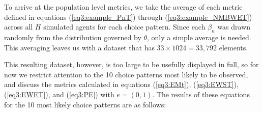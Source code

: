 \documentclass[../main.tex]{subfiles}
\begin{document}
\addtocounter{footnote}{-1}

To arrive at the population level metrics, we take the average of each metric defined in equations (\ref{eq3:example_PnT}) through (\ref{eq3:example_NMBWET}) across all $H$ simulated agents for each choice pattern.
Since each $\beta_n$ was drawn randomly from the distribution governed by $\theta$, only a simple average is needed.
This averaging leaves us with a dataset that has $33 \times 1024 = 33,792$ elements.

This resulting dataset, however, is too large to be usefully displayed in full, so for now we restrict attention to the 10 choice patterns most likely to be observed, and discuss the metrics calculated in equations (\ref{eq3:EMt}), (\ref{eq3:EWST}), (\ref{eq3:EWET}), and (\ref{eq3:PE}) with $e = (0,1)$.
The results of these equations for the 10 most likely choice patterns are as follows:

\break
\end{document}
